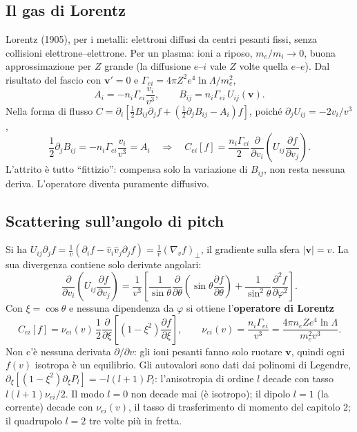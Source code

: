 \subsection{Il gas di Lorentz}
Lorentz (1905), per i metalli: elettroni diffusi da centri pesanti fissi, senza collisioni elettrone--elettrone. Per un plasma: ioni a riposo, $m_e/m_i\to0$, buona approssimazione per $Z$ grande (la diffusione $e$--$i$ vale $Z$ volte quella $e$--$e$). Dal risultato del fascio con $\mathbf{v}'=0$ e $\Gamma_{ei}=4\pi Z^2e^4\ln\Lambda/m_e^2$,
\begin{equation}
A_i=-n_i\Gamma_{ei}\frac{v_i}{v^3},\qquad B_{ij}=n_i\Gamma_{ei}\,U_{ij}(\mathbf{v}).
\end{equation}
Nella forma di flusso $C=\partial_i\left[\frac12B_{ij}\partial_jf+\left(\frac12\partial_jB_{ij}-A_i\right)f\right]$, poiché $\partial_jU_{ij}=-2v_i/v^3$,
\begin{equation}
\frac12\partial_jB_{ij}=-n_i\Gamma_{ei}\frac{v_i}{v^3}=A_i\quad\Rightarrow\quad C_{ei}[f]=\frac{n_i\Gamma_{ei}}{2}\frac{\partial}{\partial v_i}\left(U_{ij}\frac{\partial f}{\partial v_j}\right).
\end{equation}
L'attrito è tutto ``fittizio'': compensa solo la variazione di $B_{ij}$, non resta nessuna deriva. L'operatore diventa puramente diffusivo.

\subsection{Scattering sull'angolo di pitch}
Si ha $U_{ij}\partial_jf=\frac1v\left(\partial_if-\hat v_i\hat v_j\partial_jf\right)=\frac1v(\nabla_vf)_\perp$, il gradiente sulla sfera $|\mathbf{v}|=v$. La sua divergenza contiene solo derivate angolari:
\begin{equation}
\frac{\partial}{\partial v_i}\left(U_{ij}\frac{\partial f}{\partial v_j}\right)=\frac{1}{v^3}\left[\frac{1}{\sin\theta}\frac{\partial}{\partial\theta}\left(\sin\theta\frac{\partial f}{\partial\theta}\right)+\frac{1}{\sin^2\theta}\frac{\partial^2f}{\partial\varphi^2}\right].
\end{equation}
Con $\xi=\cos\theta$ e nessuna dipendenza da $\varphi$ si ottiene l'\textbf{operatore di Lorentz}
\begin{equation}
C_{ei}[f]=\nu_{ei}(v)\,\frac12\frac{\partial}{\partial\xi}\left[(1-\xi^2)\frac{\partial f}{\partial\xi}\right],\qquad\nu_{ei}(v)=\frac{n_i\Gamma_{ei}}{v^3}=\frac{4\pi n_eZe^4\ln\Lambda}{m_e^2v^3}.
\end{equation}
Non c'è nessuna derivata $\partial/\partial v$: gli ioni pesanti fanno solo ruotare $\mathbf{v}$, quindi ogni $f(v)$ isotropa è un equilibrio. Gli autovalori sono dati dai polinomi di Legendre, $\partial_\xi[(1-\xi^2)\partial_\xi P_l]=-l(l+1)P_l$: l'anisotropia di ordine $l$ decade con tasso $l(l+1)\nu_{ei}/2$. Il modo $l=0$ non decade mai (è isotropo); il dipolo $l=1$ (la corrente) decade con $\nu_{ei}(v)$, il tasso di trasferimento di momento del capitolo 2; il quadrupolo $l=2$ tre volte più in fretta.

